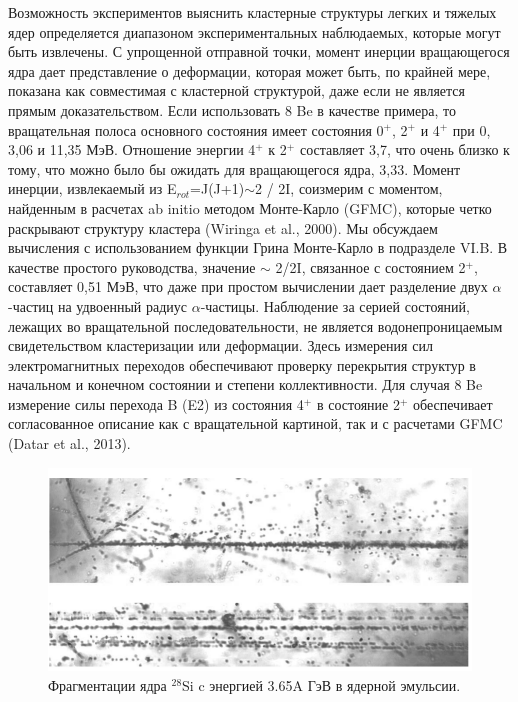 \documentclass[fontsize=14pt]{scrarticle}
\begin{document}
Возможность экспериментов выяснить кластерные структуры легких и тяжелых ядер определяется диапазоном экспериментальных наблюдаемых, которые могут быть извлечены. С упрощенной отправной точки, момент инерции вращающегося ядра дает представление о деформации, которая может быть, по крайней мере, показана как совместимая с кластерной структурой, даже если не является прямым доказательством. Если использовать 8 Be в качестве примера, то вращательная полоса основного состояния имеет состояния 0$^{+}$, 2$^{+}$ и 4$^{+}$ при 0, 3,06 и 11,35 МэВ. Отношение энергии 4$^{+}$ к 2$^{+}$ составляет 3,7, что очень близко к тому, что можно было бы ожидать для вращающегося ядра, 3,33. Момент инерции, извлекаемый из E$_{rot}$=J(J+1)$\sim$2 / 2I, соизмерим с моментом, найденным в расчетах ab initio методом Монте-Карло (GFMC), которые четко раскрывают структуру кластера (Wiringa et al., 2000). Мы обсуждаем вычисления с использованием функции Грина Монте-Карло в подразделе VI.B. В качестве простого руководства, значение $\sim$ 2/2I, связанное с состоянием 2$^{+}$, составляет 0,51 МэВ, что даже при простом вычислении дает разделение двух $\alpha$-частиц на удвоенный радиус $\alpha$-частицы. Наблюдение за серией состояний, лежащих во вращательной последовательности, не является водонепроницаемым свидетельством кластеризации или деформации. Здесь измерения сил электромагнитных переходов обеспечивают проверку перекрытия структур в начальном и конечном состоянии и степени коллективности. Для случая 8 Be измерение силы перехода B (E2) из состояния 4$^{+}$ в состояние 2$^{+}$ обеспечивает согласованное описание как с вращательной картиной, так и с расчетами GFMC (Datar et al., 2013).

\begin{figure}[!ht]
\centerline{\includegraphics[scale=.6]{Picture1.png}}
\caption{Фрагментации ядра $^{28}$Si c энергией 3.65A ГэВ в ядерной эмульсии.}
\label{fig1}
\end{figure}
\end{document}
